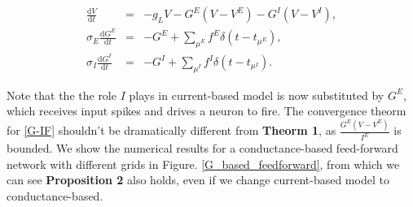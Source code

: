 \documentclass[10pt]{article}
\begin{document}
\begin{multicols}{2}

  \begin{eqnarray} 
    \frac{\mbox{d}V}{\mbox{d}t} &=&  - g_LV-G^{E}(V-V^E)-G^I(V-V^I), \nonumber\\
    \sigma_E\frac{\mbox{d}G^{E}}{\mbox{d}t} &=& -G^E+\sum_{\mu^{E}}f^{E}\delta(t-t_{\mu^{E}}),  \nonumber\\ \label{G-IF}
    \sigma_I\frac{\mbox{d}G^I}{\mbox{d}t} &=& -G^I+\sum_{\mu^I}f^I\delta(t-t_{\mu^I}). 
  \end{eqnarray}

\indent
Note that the the role $I$ plays in current-based model is now substituted by $G^E$, which receives input spikes and drives a neuron to fire.  The convergence theorm for \ref{G-IF} shouldn't be  dramatically different from \textbf{Theorm 1}, as $\frac{G^{E}(V-V^E)}{I^E}$ is bounded. We show the numerical results for a conductance-based feed-forward network with different grids in Figure. \ref{G_based_feedforward}, from which we can see {\bf{Proposition 2}} also holds, even if we change current-based model to conductance-based.
\end{multicols}
\end{document}

